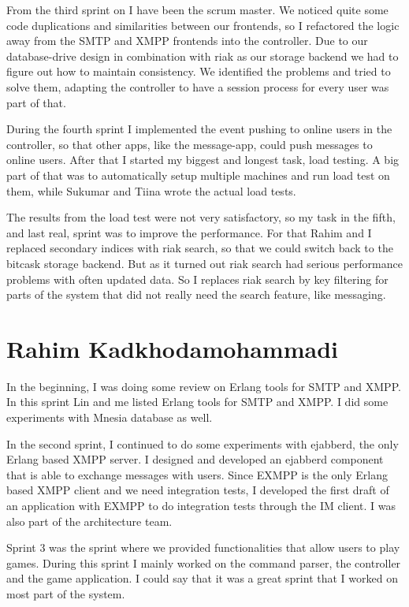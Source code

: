 \documentclass[11pt,a4paper]{report}
\begin{document}
From the third sprint on I have been the scrum master.
We noticed quite some code duplications and similarities between our frontends,
so I refactored the logic away from the SMTP and XMPP frontends into the controller.
Due to our database-drive design in combination with riak as our storage backend
we had to figure out how to maintain consistency.
We identified the problems and tried to solve them, adapting the controller to have a
session process for every user was part of that.

During the fourth sprint I implemented the event pushing to online users in the controller,
so that other apps, like the message-app, could push messages to online users.
After that I started my biggest and longest task, load testing.
A big part of that was to automatically setup multiple machines and run load test on them,
while Sukumar and Tiina wrote the actual load tests.

The results from the load test were not very satisfactory, so my task in the fifth, and last real,
sprint was to improve the performance.
For that Rahim and I replaced secondary indices with riak search, so that we could switch back to the bitcask storage backend.
But as it turned out riak search had serious performance problems with often updated data.
So I replaces riak search by key filtering for parts of the system that did not really need the search feature,
like messaging.

\section{Rahim Kadkhodamohammadi}
In the beginning, I was doing some review on Erlang tools for SMTP and XMPP.
In this sprint Lin and me listed Erlang tools for SMTP and XMPP. I did some experiments with Mnesia database as well.

In the second sprint, I continued to do some experiments with ejabberd,
the only Erlang based XMPP server. I designed and developed an ejabberd component
that is able to exchange messages with users. Since EXMPP is the
only Erlang based XMPP client and we need integration tests, I developed the first
draft of an application with EXMPP to do integration tests through the IM client.
I was also part of the architecture team.

Sprint 3 was the sprint where we provided functionalities that allow users to play games.
During this sprint I mainly worked on the command parser, the controller and the game application.
I could say that it was a great sprint that I worked on most part of the system.
\end{document}
